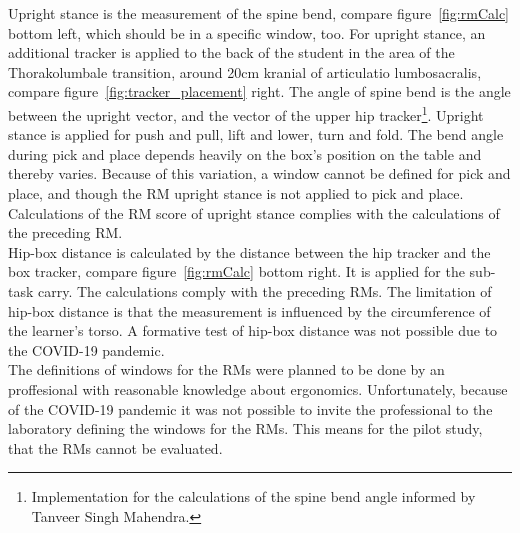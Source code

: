 Upright stance is the measurement of the spine bend, compare figure~\ref{fig:rmCalc} bottom left, which should be in a specific window, too. For upright stance, an additional tracker is applied to the back of the student in the area of the Thorakolumbale transition, around 20cm kranial of articulatio lumbosacralis, compare figure~\ref{fig:tracker_placement} right. The angle of spine bend is the angle between the upright vector, and the vector of the upper hip tracker\footnote{Implementation for the calculations of the spine bend angle informed by Tanveer Singh Mahendra.}. Upright stance is applied for push and pull, lift and lower, turn and fold. The bend angle during pick and place depends heavily on the box's position on the table and thereby varies. Because of this variation, a window cannot be defined for pick and place, and though the RM upright stance is not applied to pick and place. Calculations of the RM score of upright stance complies with the calculations of the preceding RM.\\
Hip-box distance is calculated by the distance between the hip tracker and the box tracker, compare figure~\ref{fig:rmCalc} bottom right. It is applied for the sub-task carry. The calculations comply with the preceding RMs. The limitation of hip-box distance is that the measurement is influenced by the circumference of the learner's torso. A formative test of hip-box distance was not possible due to the COVID-19 pandemic.\\

The definitions of windows for the RMs were planned to be done by an proffesional with reasonable knowledge about ergonomics. Unfortunately, because of the COVID-19 pandemic it was not possible to invite the professional to the laboratory defining the windows for the RMs. This means for the pilot study, that the RMs cannot be evaluated.

